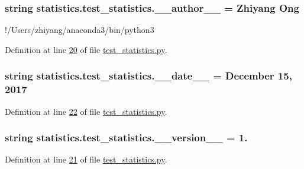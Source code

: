 \subsubsection[{\+\_\+\+\_\+author\+\_\+\+\_\+}]{\setlength{\rightskip}{0pt plus 5cm}string statistics.\+test\+\_\+statistics.\+\_\+\+\_\+author\+\_\+\+\_\+ = \textquotesingle{}Zhiyang Ong\textquotesingle{}}\label{namespacestatistics_1_1test__statistics_a188ace18635f13c413bf14347b4eb7f0}


!/\+Users/zhiyang/anaconda3/bin/python3 



Definition at line \hyperlink{test__statistics_8py_source_l00020}{20} of file \hyperlink{test__statistics_8py_source}{test\+\_\+statistics.\+py}.

\hypertarget{namespacestatistics_1_1test__statistics_a271285b175d250f7888c9b41fa124abd}{}
\subsubsection[{\+\_\+\+\_\+date\+\_\+\+\_\+}]{\setlength{\rightskip}{0pt plus 5cm}string statistics.\+test\+\_\+statistics.\+\_\+\+\_\+date\+\_\+\+\_\+ = \textquotesingle{}December 15, 2017\textquotesingle{}}\label{namespacestatistics_1_1test__statistics_a271285b175d250f7888c9b41fa124abd}


Definition at line \hyperlink{test__statistics_8py_source_l00022}{22} of file \hyperlink{test__statistics_8py_source}{test\+\_\+statistics.\+py}.

\hypertarget{namespacestatistics_1_1test__statistics_ad5c236202b813efcbc877e38a20d7f07}{}
\subsubsection[{\+\_\+\+\_\+version\+\_\+\+\_\+}]{\setlength{\rightskip}{0pt plus 5cm}string statistics.\+test\+\_\+statistics.\+\_\+\+\_\+version\+\_\+\+\_\+ = \textquotesingle{}1.\textquotesingle{}}\label{namespacestatistics_1_1test__statistics_ad5c236202b813efcbc877e38a20d7f07}


Definition at line \hyperlink{test__statistics_8py_source_l00021}{21} of file \hyperlink{test__statistics_8py_source}{test\+\_\+statistics.\+py}.

